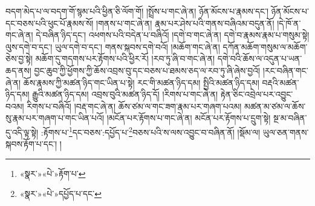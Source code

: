 བདག་མེད་པ་ལ་བདག་གོ་སྙམ་པའི་ཕྱིན་ཅི་ལོག་གོ། །སྤྲོས་པ་གང་ཞེ་ན། ཉོན་མོངས་པ་རྣམས་དང་། ཉོན་མོངས་པ་དང་བཅས་པའི་ཕུང་པོ་རྣམས་སོ། །གནས་པ་གང་ཞེ་ན། རྣམ་པར་ཤེས་པའི་གནས་བཞིའམ་བདུན་ནོ། །དེ་ཁོ་ན་གང་ཞེ་ན། དེ་བཞིན་ཉིད་དང་། འཕགས་པའི་བདེན་པ་བཞིའོ། །དགེ་བ་གང་ཞེ་ན། དགེ་བ་རྣམས་རྣམ་པ་གསུམ་སྟེ། ལུས་དགེ་བ་དང་། ཡུལ་དགེ་བ་དང་། གནས་སྐབས་དགེ་བའོ། །མཆོག་གང་ཞེ་ན། དཀོན་མཆོག་གསུམ་ལ་མཆོག་ཅེས་བྱ་སྟེ། མཆོག་དུ་གདགས་པར་རྟོགས་པའི་ཕྱིར་རོ། །རབ་ཏུ་ཞི་བ་གང་ཞེ་ན། དགེ་བའི་ཆོས་ལ་འདུན་པ་ཡན་ཆད་ནས། བྱང་ཆུབ་ཀྱི་ཕྱོགས་ཀྱི་ཆོས་འབྲས་བུ་དང་བཅས་པ་ཐམས་ཅད་ལ་རབ་ཏུ་ཞི་ཞེས་བྱའོ། །རང་བཞིན་གང་ཞེ་ན། ཆོས་རྣམས་ཀྱི་མཚན་ཉིད་གང་ཡིན་པ་སྟེ། རང་གི་མཚན་ཉིད་དམ། སྤྱིའི་མཚན་ཉིད་དམ། བརྡའི་མཚན་ཉིད་དམ། རྒྱུའི་མཚན་ཉིད་དམ། འབྲས་བུའི་མཚན་ཉིད་དོ། །རིགས་པ་གང་ཞེ་ན། རྟེན་ཅིང་འབྲེལ་པར་འབྱུང་བའམ། རིགས་པ་བཞིའོ། །བརྡ་གང་ཞེ་ན། ཆོས་ཙམ་ལ་གང་ཟག་རྣམ་པར་གཞག་པའམ། མཚན་མ་ཙམ་ལ་ཆོས་སུ་རྣམ་པར་གཞག་པ་གང་ཡིན་པའོ། །མངོན་པར་རྟོགས་པ་གང་ཞེ་ན། མངོན་པར་རྟོགས་པ་དྲུག་སྟེ། སྔ་མ་བཞིན་དུ་འདི་ལྟ་སྟེ། :རྟོགས་པ་\footnote{«སྣར་»«པེ་»རྟོག་པ་}དང་བཅས་:དཔྱོད་པ་\footnote{«སྣར་»«པེ་»དཔྱོད་པ་དང་}བཅས་པའི་ས་ལས་འབྱུང་བ་བཞིན་ནོ། །སྡོམ་ལ། ཡུལ་ཅན་གནས་སྐབས་རྟོག་པ་དང་། །
